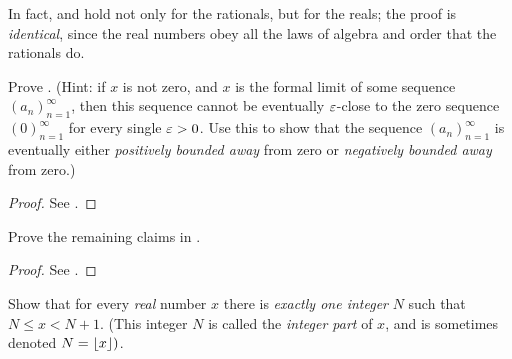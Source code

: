 \begin{proposition} \label{prop 5.4.17}
In fact,  and  hold not only for the rationals, but for the reals;
the proof is \emph{identical}, since the real numbers obey all the laws of algebra and order that the rationals do.
\end{proposition}

\exercisesection

\begin{exercise} \label{exercise 5.4.1}
Prove .
(Hint: if \(x\) is not zero, and \(x\) is the formal limit of some sequence \((a_n)_{n = 1}^{\infty}\), then this sequence cannot be eventually \(\varepsilon\)-close to the zero sequence \((0)_{n = 1}^{\infty}\) for every single \(\varepsilon > 0\).
Use this to show that the sequence \((a_n)_{n = 1}^{\infty}\) is eventually either \emph{positively bounded away} from zero or \emph{negatively bounded away} from zero.)
\end{exercise}

\begin{proof}
See .
\end{proof}

\begin{exercise} \label{exercise 5.4.2}
Prove the remaining claims in .
\end{exercise}

\begin{proof}
See .
\end{proof}

\begin{exercise} \label{exercise 5.4.3}
Show that for every \emph{real} number \(x\) there is \emph{exactly one integer} \(N\) such that \(N \le x < N + 1\).
(This integer \(N\) is called the \emph{integer part} of \(x\), and is sometimes denoted \(N = \lfloor{x}\rfloor)\).
\end{exercise}

